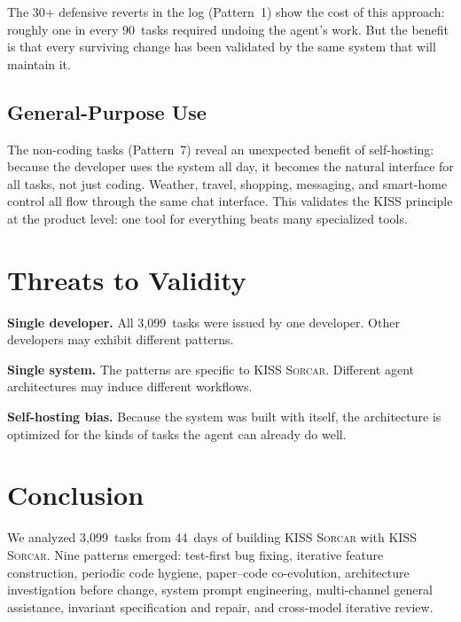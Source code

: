 \documentclass{article}
\newcommand{\kisssys}{\textsc{KISS Sorcar}}
\begin{document}
The 30+ defensive reverts in the log (Pattern~1) show the cost of
this approach: roughly one in every 90~tasks required undoing the
agent's work.
But the benefit is that every surviving change has been validated
by the same system that will maintain it.

\subsection{General-Purpose Use}

The non-coding tasks (Pattern~7) reveal an unexpected benefit of
self-hosting: because the developer uses the system all day, it
becomes the natural interface for all tasks, not just coding.
Weather, travel, shopping, messaging, and smart-home control all
flow through the same chat interface.
This validates the KISS principle at the product level:
one tool for everything beats many specialized tools.

\section{Threats to Validity}
\label{sec:threats}

\textbf{Single developer.}
All 3,099~tasks were issued by one developer.
Other developers may exhibit different patterns.

\textbf{Single system.}
The patterns are specific to \kisssys{}.
Different agent architectures may induce different workflows.

\textbf{Self-hosting bias.}
Because the system was built with itself, the architecture is
optimized for the kinds of tasks the agent can already do well.

\section{Conclusion}
\label{sec:conclusion}

We analyzed 3,099~tasks from 44~days of building \kisssys{} with
\kisssys{}.
Nine patterns emerged: test-first bug fixing, iterative feature
construction, periodic code hygiene, paper--code co-evolution,
architecture investigation before change, system prompt engineering,
multi-channel general assistance, invariant specification and
repair, and cross-model iterative review.
\end{document}
